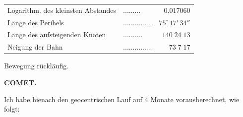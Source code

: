 \begin{center}\fontsize{10}{12}\selectfont\setlength{\tabcolsep}{4pt}\renewcommand{\arraystretch}{1.15}\begin{tabular}{llr}
Logarithm. des kleinsten Abstandes & .\;.\;.\;.\;.\;.\;.\;.\;. & $0.017060$\\
Länge des Perihels & .\;.\;.\;.\;.\;.\;.\;.\;.\;.\;.\;.\;.\;.\;. & $75^\circ\,17'\,34''$\\
Länge des aufsteigenden Knoten & .\;.\;.\;.\;.\;.\;.\;.\;.\;. & $140\;24\;13$\\
Neigung der Bahn & .\;.\;.\;.\;.\;.\;.\;.\;.\;.\;.\;.\;.\;.\;. & $73\;7\;17$\\
\end{tabular}\end{center}
\noindent Bewegung rückläufig.

\clearpage
\endgroup

\clearpage
\begingroup
\pagestyle{empty}
\thispagestyle{empty}
\noindent{}%
%
\parbox[t]{\dimexpr\linewidth-24mm\relax}{\centering\footnotesize\bfseries COMET.\par}%
\makebox[12mm][r]{}\par\nobreak\medskip
\par\indent Ich habe hienach den geocentrischen Lauf auf 4 Monate vorausberechnet, wie folgt:

